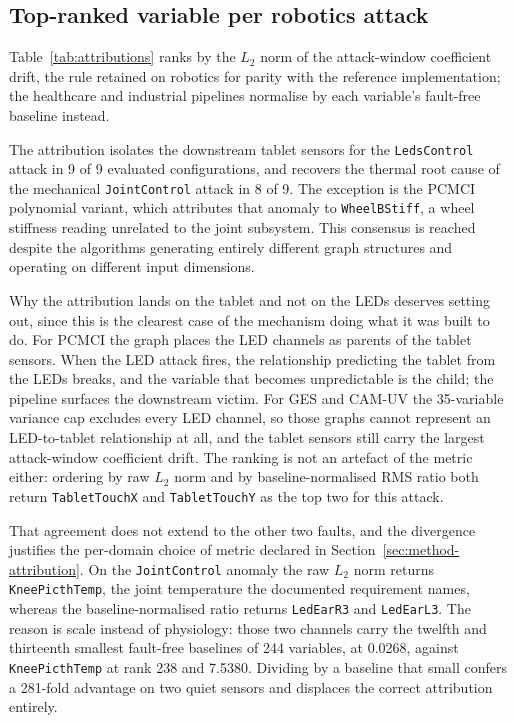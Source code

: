\subsection{Top-ranked variable per robotics attack}

Table~\ref{tab:attributions} ranks by the $L_2$ norm of the attack-window coefficient drift, the rule retained on robotics for parity with the reference implementation; the healthcare and industrial pipelines normalise by each variable's fault-free baseline instead.



The attribution isolates the downstream tablet sensors for the \texttt{LedsControl} attack in 9 of 9 evaluated configurations, and recovers the thermal root cause of the mechanical \texttt{JointControl} attack in 8 of 9. The exception is the PCMCI polynomial variant, which attributes that anomaly to \texttt{WheelBStiff}, a wheel stiffness reading unrelated to the joint subsystem. This consensus is reached despite the algorithms generating entirely different graph structures and operating on different input dimensions.

Why the attribution lands on the tablet and not on the LEDs deserves setting out, since this is
the clearest case of the mechanism doing what it was built to do. For PCMCI the graph places the LED channels as parents of the tablet sensors. When the LED attack fires, the relationship predicting the tablet from the LEDs breaks, and the variable that becomes unpredictable is the child; the pipeline surfaces the downstream victim. For GES and CAM-UV the 35-variable variance cap excludes every LED channel, so those graphs cannot represent an LED-to-tablet relationship at all, and the tablet sensors still carry the largest attack-window coefficient drift. The ranking is not an artefact of the metric either: ordering by raw $L_2$ norm and by baseline-normalised RMS ratio both return \texttt{TabletTouchX} and \texttt{TabletTouchY} as the top two for this attack.

That agreement does not extend to the other two faults, and the divergence justifies the per-domain choice of metric declared in Section~\ref{sec:method-attribution}. On the \texttt{JointControl} anomaly the raw $L_2$ norm returns \texttt{KneePicthTemp}, the joint temperature the documented requirement names, whereas the baseline-normalised ratio returns \texttt{LedEarR3} and \texttt{LedEarL3}. The reason is scale instead of physiology: those two channels carry the twelfth and thirteenth smallest fault-free baselines of 244 variables, at 0.0268, against \texttt{KneePicthTemp} at rank 238 and 7.5380. Dividing by a baseline that small confers a 281-fold advantage on two quiet sensors and displaces the correct attribution entirely.

